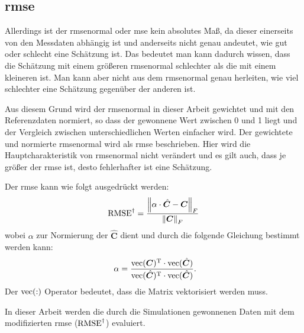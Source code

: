\subsection*{\acrfull{rmse}}
Allerdings ist der \acrshort{rmsenormal} oder \acrshort{mse} kein absolutes Maß, da dieser einerseits von den Messdaten abhängig ist und anderseits nicht genau andeutet, wie gut oder schlecht eine Schätzung ist. Das bedeutet man kann dadurch wissen, dass die Schätzung mit einem größeren \acrshort{rmsenormal} schlechter als die mit einem kleineren ist. Man kann aber nicht aus dem \acrshort{rmsenormal} genau herleiten, wie viel schlechter eine Schätzung gegenüber der anderen ist.\par
Aus diesem Grund wird der \acrshort{rmsenormal} in dieser Arbeit gewichtet und mit den Referenzdaten normiert, so dass der gewonnene Wert zwischen 0 und 1 liegt und der Vergleich zwischen unterschiedlichen Werten einfacher wird. Der gewichtete und normierte \acrshort{rmsenormal} wird als \acrshort{rmse} beschrieben. Hier wird die Hauptcharakteristik von \acrshort{rmsenormal} nicht verändert und es gilt auch, dass je größer der \acrshort{rmse} ist, desto fehlerhafter ist eine Schätzung. \par
Der \acrshort{rmse} kann wie folgt ausgedrückt werden:
\begin{equation} \label{eq:GRMSE}
\operatorname{RMSE}^{\dagger} = \frac{\left \| \alpha \cdot \hat{\bm{C}} - \bm{C} \right \|_{F}}{\left \| \bm{C} \right \|_{F}}
\end{equation}
wobei $\alpha$ zur Normierung der $\hat{\bm{C}}$ dient und durch die folgende Gleichung bestimmt werden kann:
\begin{equation} \
\alpha = \frac{ \operatorname{vec}(\bm{C})^{\operatorname{T}} \cdot \operatorname{vec}(\hat{\bm{C}}) }{ \operatorname{vec}(\hat{\bm{C}})^{\operatorname{T}} \cdot \operatorname{vec}(\hat{\bm{C}})} .
\end{equation}
Der $\operatorname{vec}(:)$ Operator bedeutet, dass die Matrix vektorisiert werden muss. \par
In dieser Arbeit werden die durch die Simulationen gewonnenen Daten mit dem modifizierten \acrshort{rmse} ($\operatorname{RMSE}^{\dagger}$) evaluiert.






